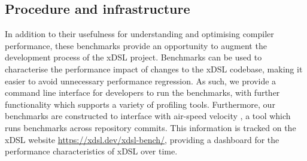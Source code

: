 


\subsection{Procedure and infrastructure}
\label{ssec:procedure-infrastructure}



In addition to their usefulness for understanding and optimising compiler performance, these benchmarks provide an opportunity to augment the development process of the xDSL project.
Benchmarks can be used to characterise the performance impact of changes to the xDSL codebase, making it easier to avoid unnecessary performance regression.
As such, we provide a command line interface for developers to run the benchmarks, with further functionality which supports a variety of profiling tools.
Furthermore, our benchmarks are constructed to interface with air-speed velocity \cite{michaeldroettboomAirspeedvelocityAsv2025}, a tool which runs benchmarks across repository commits. This information is tracked on the xDSL website \url{https://xdsl.dev/xdsl-bench/}, providing a dashboard for the performance characteristics of xDSL over time.


















